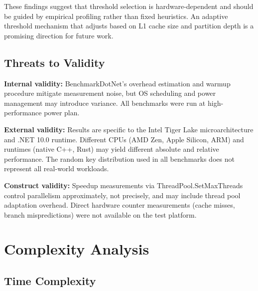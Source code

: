 \documentclass[conference]{IEEEtran}
\begin{document}
These findings suggest that threshold selection is hardware-dependent and should be guided by empirical profiling rather than fixed heuristics. An adaptive threshold mechanism that adjusts based on L1 cache size and partition depth is a promising direction for future work.

\subsection{Threats to Validity}
\label{sec:threats}

\textbf{Internal validity:} BenchmarkDotNet's overhead estimation and warmup procedure mitigate measurement noise, but OS scheduling and power management may introduce variance. All benchmarks were run at high-performance power plan.

\textbf{External validity:} Results are specific to the Intel Tiger Lake microarchitecture and .NET 10.0 runtime. Different CPUs (AMD Zen, Apple Silicon, ARM) and runtimes (native C++, Rust) may yield different absolute and relative performance. The random key distribution used in all benchmarks does not represent all real-world workloads.

\textbf{Construct validity:} Speedup measurements via ThreadPool.SetMaxThreads control parallelism approximately, not precisely, and may include thread pool adaptation overhead. Direct hardware counter measurements (cache misses, branch mispredictions) were not available on the test platform.

\section{Complexity Analysis}
\label{sec:complexity}

\subsection{Time Complexity}
\label{sec:time_complexity}
\end{document}
